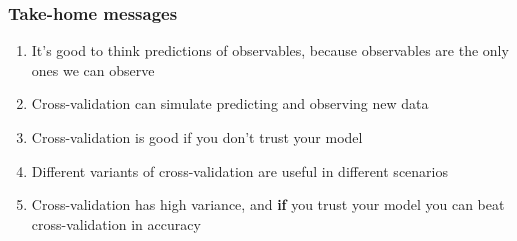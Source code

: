 \documentclass[10pt]{beamer}
\begin{document}








\begin{frame}{}

\frametitle{Take-home messages}

  \begin{enumerate}
  \item It's good to think predictions of observables, because
    observables are the only ones we can observe
  \item {}Cross-validation can simulate predicting and observing new
    data
  \item {}Cross-validation is good if you don't
    trust your model
  \item {}Different variants of cross-validation
    are useful in different scenarios
  \item {}Cross-validation has high variance, and
    {\bf if} you trust your model you can beat cross-validation in
    accuracy
  \end{enumerate}

\end{frame}



\end{document}

